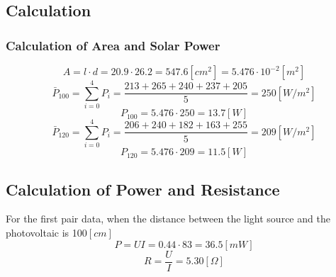 \documentclass[12pt]{article}
\begin{document}
\subsection{Calculation}
\subsubsection{Calculation of Area and Solar Power}
$$A=l\cdot d=20.9\cdot26.2=547.6[cm^2]=5.476\cdot10^{-2}[m^2]$$
$$\bar{P}_{100}=\sum_{i=0}^4P_i=\frac{213+265+240+237+205}{5}=250[W/m^2]$$
$$P_{100}=5.476\cdot250=13.7[W]$$
$$\bar{P}_{120}=\sum_{i=0}^4P_i=\frac{206+240+182+163+255}{5}=209[W/m^2]$$
$$P_{120}=5.476\cdot209=11.5[W]$$
\subsection{Calculation of Power and Resistance}
For the first pair data, when the distance between the light source and the photovoltaic is 100$[cm]$
$$P=UI=0.44\cdot83=36.5[mW]$$
$$R=\frac{U}{I}=5.30[\Omega]$$
\end{document}
